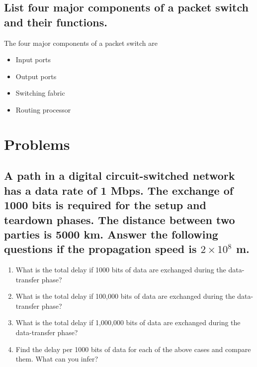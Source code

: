 \documentclass{article}
\begin{document}
\subsection{
	List four major components of a packet switch and their functions.
}
The four major components of a packet switch are
\begin{itemize}
	\item Input ports
	\item Output ports
	\item Switching fabric
	\item Routing processor
\end{itemize}

\section{Problems}
\subsection{
	A path in a digital circuit-switched network has a data rate of 1 Mbps. The exchange of 1000 bits is required for the setup and teardown phases. The distance between two parties is 5000 km. Answer the following questions if the propagation speed is
	\texorpdfstring{$ 2 \times 10^8 $}{2 x 10^8} m.
}
\begin{enumerate}
	\item What is the total delay if 1000 bits of data are exchanged during the data-transfer phase?
	\item What is the total delay if 100,000 bits of data are exchanged during the data-transfer phase?
	\item What is the total delay if 1,000,000 bits of data are exchanged during the data-transfer phase?
	\item Find the delay per 1000 bits of data for each of the above cases and compare them. What can you infer?
\end{enumerate}
\end{document}
